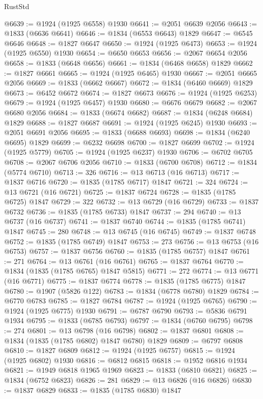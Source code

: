 \begin{lexlean}{RustStd}
\begin{coremodule}
@6639 := @1924 (@1925 @6558) @1930
@6641 := @2051 @6639 @2056
@6643 := @1833 (@6636 @6641)
@6646 := @1834 (@6553 @6643) @1829
@6647 := @6545 @6646
@6648 := @1827 @6647
@6650 := @1924 (@1925 @6473)
@6653 := @1924 (@1925 @6550) @1930
@6654 := @6650 @6653
@6656 := @2067 @6654 @2056
@6658 := @1833 (@6648 @6656)
@6661 := @1834 (@6468 @6658) @1829
@6662 := @1827 @6661
@6665 := @1924 (@1925 @6465) @1930
@6667 := @2051 @6665 @2056
@6669 := @1833 (@6662 @6667)
@6672 := @1834 (@6460 @6669) @1829
@6673 := @6452 @6672
@6674 := @1827 @6673
@6676 := @1924 (@1925 @6253)
@6679 := @1924 (@1925 @6457) @1930
@6680 := @6676 @6679
@6682 := @2067 @6680 @2056
@6684 := @1833 (@6674 @6682)
@6687 := @1834 (@6248 @6684) @1829
@6688 := @1827 @6687
@6691 := @1924 (@1925 @6245) @1930
@6693 := @2051 @6691 @2056
@6695 := @1833 (@6688 @6693)
@6698 := @1834 (@6240 @6695) @1829
@6699 := @6232 @6698
@6700 := @1827 @6699
@6702 := @1924 (@1925 @5779)
@6705 := @1924 (@1925 @6237) @1930
@6706 := @6702 @6705
@6708 := @2067 @6706 @2056
@6710 := @1833 (@6700 @6708)
@6712 := @1834 (@5774 @6710)
@6713 := 326
@6716 := @13 @6713 (@16 @6713)
@6717 := @1837 @6716
@6720 := @1835 (@1785 @6717) @1847
@6721 := 324
@6724 := @13 @6721 (@16 @6721)
@6725 := @1837 @6724
@6728 := @1835 (@1785 @6725) @1847
@6729 := 322
@6732 := @13 @6729 (@16 @6729)
@6733 := @1837 @6732
@6736 := @1835 (@1785 @6733) @1847
@6737 := 294
@6740 := @13 @6737 (@16 @6737)
@6741 := @1837 @6740
@6744 := @1835 (@1785 @6741) @1847
@6745 := 280
@6748 := @13 @6745 (@16 @6745)
@6749 := @1837 @6748
@6752 := @1835 (@1785 @6749) @1847
@6753 := 273
@6756 := @13 @6753 (@16 @6753)
@6757 := @1837 @6756
@6760 := @1835 (@1785 @6757) @1847
@6761 := 271
@6764 := @13 @6761 (@16 @6761)
@6765 := @1837 @6764
@6770 := @1834 (@1835 (@1785 @6765) @1847 @5815)
@6771 := 272
@6774 := @13 @6771 (@16 @6771)
@6775 := @1837 @6774
@6778 := @1835 (@1785 @6775) @1847
@6780 := @1907 (@5826 @122)
@6783 := @1834 (@6778 @6780) @1829
@6784 := @6770 @6783
@6785 := @1827 @6784
@6787 := @1924 (@1925 @6765)
@6790 := @1924 (@1925 @6775) @1930
@6791 := @6787 @6790
@6793 := @5836 @6791 @1934
@6795 := @1833 (@6785 @6793)
@6797 := @1834 (@6760 @6795)
@6798 := 274
@6801 := @13 @6798 (@16 @6798)
@6802 := @1837 @6801
@6808 := @1834 (@1835 (@1785 @6802) @1847 @6780) @1829
@6809 := @6797 @6808
@6810 := @1827 @6809
@6812 := @1924 (@1925 @6757)
@6815 := @1924 (@1925 @6802) @1930
@6816 := @6812 @6815
@6818 := @1952 @6816 @1934
@6821 := @1949 @6818 @1965 @1969
@6823 := @1833 (@6810 @6821)
@6825 := @1834 (@6752 @6823)
@6826 := 281
@6829 := @13 @6826 (@16 @6826)
@6830 := @1837 @6829
@6833 := @1835 (@1785 @6830) @1847

\end{coremodule}
\end{lexlean}
